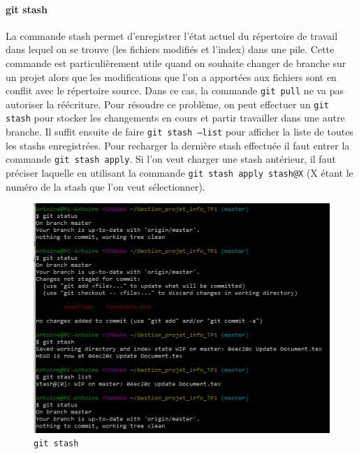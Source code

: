 \documentclass[11pt,canadien]{article}
\begin{document}
\paragraph{git stash}La commande stash permet d'enregistrer l'état actuel du répertoire de travail dans lequel on se trouve (les fichiers modifiés et l'index) dans une pile. Cette commande est particulièrement utile quand on souhaite changer de branche sur un projet alors que les modifications que l'on a apportées aux fichiers sont en conflit avec le répertoire source. Dans ce cas, la commande \texttt{git pull} ne va pas autoriser la réécriture. Pour résoudre ce problème, on peut effectuer un \texttt{git stash} pour stocker les changements en cours et partir travailler dans une autre branche. Il suffit ensuite de faire \texttt{git stash --list} pour afficher la liste de toutes les stashs enregistrées. Pour recharger la dernière stash effectuée il faut entrer la commande \texttt{git stash apply}. Si l'on veut charger une stash antérieur, il faut préciser laquelle en utilisant la commande \texttt{git stash apply stash@{X}} (X étant le numéro de la stash que l'on veut sélectionner).
\begin{figure}[h]
	\centering
	\includegraphics{images/git_stash.png}
	\caption{\texttt{git stash}}
	\label{fig:git_stash}
\end{figure}
\end{document}
